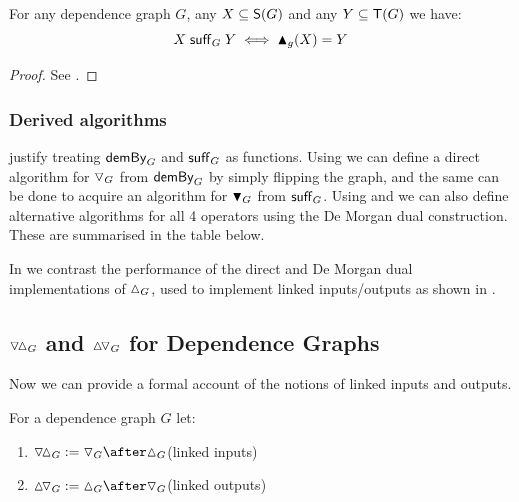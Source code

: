 

\begin{proposition}
   \label{prop:sufficesAlg-computes-suffices}
   For any dependence graph $G$, any $X \subseteq \mathsf{S}(G)$ and any $Y \subseteq \mathsf{T}(G)$ we have:
   \[X \mathrel{\textup{\textsf{suff}}_{G}} Y \iff \blacktriangle_{g}(X) = Y\]
\end{proposition}
\begin{proof}
   See .
\end{proof}

\subsubsection{Derived algorithms}

 justify treating
$\mathrel{\textup{\textsf{demBy}}_{G}}$ and $\mathrel{\textup{\textsf{suff}}_{G}}$ as functions. Using  we can
define a direct algorithm for $\triangledown_{G}$ from $\mathrel{\textup{\textsf{demBy}}_{G}}$ by simply flipping the graph, and the
same can be done to acquire an algorithm for $\blacktriangledown_{G}$ from $\mathrel{\textup{\textsf{suff}}_{G}}$. Using
 and  we can also define alternative
algorithms for all 4 operators using the De Morgan dual construction. These are summarised in the table below.



\noindent In  we contrast the performance of the direct and De Morgan dual implementations
of $\demandedByR_{G}$, used to implement linked inputs/outputs as shown in .

\subsection{$\relInputR_G$ and $\relOutputR_G$ for Dependence Graphs}

Now we can provide a formal account of the notions of linked inputs and outputs.

\begin{definition}
   For a dependence graph $G$ let:
   \begin{enumerate}
      \item $\relInputR_{G} \eqdef \demandsR_{G} \after \demandedByR_{G}$\hfill (linked inputs)
      \item $\relOutputR_{G} \eqdef \demandedByR_{G} \after \demandsR_{G}$\hfill (linked outputs)
   \end{enumerate}
\end{definition}

